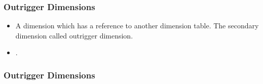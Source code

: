 \VideoClassification[column=1, colour=blue]
\begin{frame}
    \frametitle{Outrigger Dimensions}
    \begin{itemize}[<+->]
        \item A dimension which has a reference to another dimension table. The secondary dimension called outrigger dimension.
        \item {}.
    \end{itemize}
\end{frame}
\begin{frame}
    \frametitle{Outrigger Dimensions}
    \centering
    
\end{frame}




